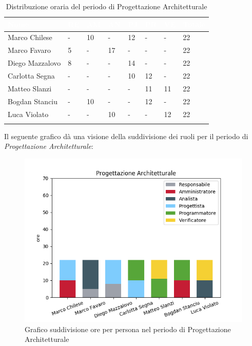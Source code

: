 \begin{longtable}{|C{.30\textwidth}|C{.06\textwidth}|C{.06\textwidth}|C{.06\textwidth} | C{.06\textwidth}| C{.06\textwidth} | C{.06\textwidth} | C{.10\textwidth} |}
\hline
{}	\textbf{\textcolor{white}{Nome}} & \textbf{\textcolor{white}{RE}} & \textbf{\textcolor{white}{AM}} & \textbf{\textcolor{white}{AN}} & \textbf{\textcolor{white}{PJ}} & \textbf{\textcolor{white}{PR}} & \textbf{\textcolor{white}{VE}} & \textbf{\textcolor{white}{Totale}}\\
\hline 
Marco Chilese & - & 10 & - & 12 & - & - & 22 \\
\hline
{}Marco Favaro & 5 & - & 17 & - & - & - & 22 \\
\hline
Diego Mazzalovo & 8 & - & - & 14 & - & - & 22 \\ 
\hline
{}Carlotta Segna & - & - & - & 10 & 12 & - & 22 \\
\hline
Matteo Slanzi & - & - & - & - & 11 & 11 & 22 \\
\hline
{}Bogdan Stanciu & - & 10 & - & - & 12 & - & 22 \\
\hline
Luca Violato & - & - & 10 & - & - & 12 & 22 \\
\hline 

\caption{Distribuzione oraria del periodo di Progettazione Architetturale}
\label{Distribuzione oraria del periodo di pa}
\end{longtable}

Il seguente grafico dà una visione della suddivisione dei ruoli per il periodo di \textit{Progettazione Architetturale}:

\begin{figure}[H]
	\centering
  		\includegraphics[width=0.8\linewidth]{./images/fig_pa.png}
  		\caption{Grafico suddivisione ore per persona nel periodo di Progettazione Architetturale}
  		\label{fig:grafico suddivione ruoli periodo di pa}
\end{figure}



